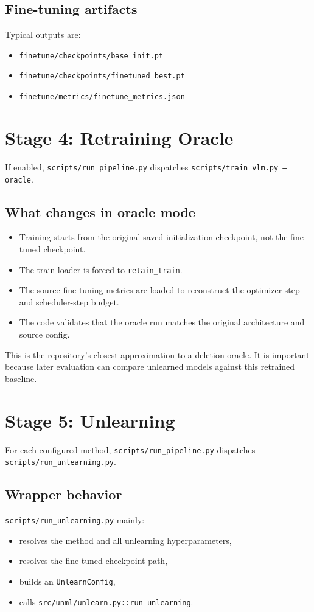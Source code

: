 \documentclass[10pt,a4paper]{article}
\begin{document}
\subsection{Fine-tuning artifacts}
Typical outputs are:
\begin{itemize}
  \item \texttt{finetune/checkpoints/base\_init.pt}
  \item \texttt{finetune/checkpoints/finetuned\_best.pt}
  \item \texttt{finetune/metrics/finetune\_metrics.json}
\end{itemize}

\section{Stage 4: Retraining Oracle}
If enabled, \texttt{scripts/run\_pipeline.py} dispatches \texttt{scripts/train\_vlm.py --oracle}.

\subsection{What changes in oracle mode}
\begin{itemize}
  \item Training starts from the original saved initialization checkpoint, not the fine-tuned checkpoint.
  \item The train loader is forced to \texttt{retain\_train}.
  \item The source fine-tuning metrics are loaded to reconstruct the optimizer-step and scheduler-step budget.
  \item The code validates that the oracle run matches the original architecture and source config.
\end{itemize}

This is the repository's closest approximation to a deletion oracle. It is important because later evaluation can compare unlearned models against this retrained baseline.

\section{Stage 5: Unlearning}
For each configured method, \texttt{scripts/run\_pipeline.py} dispatches \texttt{scripts/run\_unlearning.py}.

\subsection{Wrapper behavior}
\texttt{scripts/run\_unlearning.py} mainly:
\begin{itemize}
  \item resolves the method and all unlearning hyperparameters,
  \item resolves the fine-tuned checkpoint path,
  \item builds an \texttt{UnlearnConfig},
  \item calls \texttt{src/unml/unlearn.py::run\_unlearning}.
\end{itemize}
\end{document}
